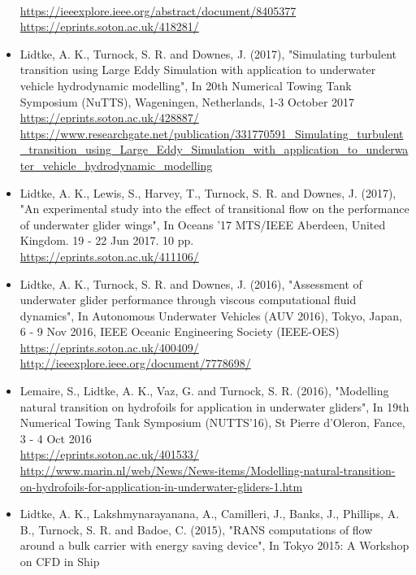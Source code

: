 \documentclass[a4paper,10pt]{article}
\begin{document}
\begin{itemize}
	\cite{Lidtke2018a}
	\\ \url{https://ieeexplore.ieee.org/abstract/document/8405377}
	\\ \url{https://eprints.soton.ac.uk/418281/}
%
\item Lidtke, A. K., Turnock, S. R. and Downes, J. (2017),
	"Simulating turbulent transition using Large Eddy Simulation with application to underwater vehicle hydrodynamic modelling",
	In 20th Numerical Towing Tank Symposium (NuTTS), Wageningen, Netherlands, 1-3 October 2017
	\cite{Lidtke2017a}
	\\ \url{https://eprints.soton.ac.uk/428887/}
	\\ \url{https://www.researchgate.net/publication/331770591\_Simulating\_turbulent\_transition\_using\_Large\_Eddy\_Simulation\_with\_application\_to\_underwater\_vehicle\_hydrodynamic\_modelling}
%
\item Lidtke, A. K., Lewis, S., Harvey, T., Turnock, S. R. and Downes, J. (2017),
	"An experimental study into the effect of transitional flow on the performance
	of underwater glider wings", In Oceans '17 MTS/IEEE Aberdeen, United Kingdom.
	19 - 22 Jun 2017. 10 pp.
	\cite{Lidtke2017b}
	\\ \url{https://eprints.soton.ac.uk/411106/}
%
\item Lidtke, A. K., Turnock, S. R. and Downes, J. (2016), "Assessment of underwater
	glider performance through viscous computational fluid dynamics", In Autonomous
	Underwater Vehicles (AUV 2016), Tokyo, Japan, 6 - 9 Nov 2016, IEEE Oceanic Engineering Society (IEEE-OES)
	\cite{Lidtke2016d}
	\\ \url{https://eprints.soton.ac.uk/400409/}
	\\ \url{http://ieeexplore.ieee.org/document/7778698/}
%
\item Lemaire, S., Lidtke, A. K., Vaz, G. and Turnock, S. R. (2016), "Modelling
	natural transition on hydrofoils for application in underwater gliders",
	In 19th Numerical Towing Tank Symposium (NUTTS'16), St Pierre d'Oleron, Fance, 3 - 4 Oct 2016
	\cite{Lemaire2016}
	\\ \url{https://eprints.soton.ac.uk/401533/}
	\\ \url{http://www.marin.nl/web/News/News-items/Modelling-natural-transition-on-hydrofoils-for-application-in-underwater-gliders-1.htm}
%
\item Lidtke, A. K., Lakshmynarayanana, A., Camilleri, J., Banks, J., Phillips, A. B.,
	Turnock, S. R. and Badoe, C. (2015), "RANS computations of flow around a bulk
	carrier with energy saving device", In Tokyo 2015: A Workshop on CFD in Ship

\end{itemize}
\end{document}
